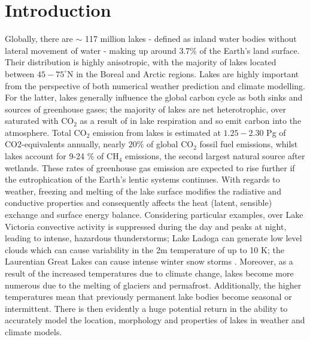 \documentclass[twocolumn]{article}
\begin{document}
\section{Introduction}  %
Globally, there are $\sim$ 117 million lakes - defined as inland water bodies without lateral movement of water - making up around 3.7$\%$ of the Earth's land surface\cite{Verpoorter2014}. Their distribution is highly anisotropic, with the majority of lakes located between $45-75^{\circ}$N in the Boreal and Arctic regions. Lakes are highly important from the perspective of both numerical weather prediction and climate modelling.  For the latter, lakes generally influence the global carbon cycle as both sinks and sources of greenhouse gases; the majority of lakes are net heterotrophic, over saturated with CO$_2$ as a result of in lake respiration and so emit carbon into the atmosphere\cite{Pace2005,Tranvik2009}.  Total CO$_2$ emission from lakes is estimated at $1.25 - 2.30$ Pg of CO2-equivalents annually\cite{DelSontro2018}, nearly $20 \%$ of global CO$_2$ fossil fuel emissions, whilst lakes account for 9-24 $\%$  of CH$_4$ emissions, the second largest natural source after wetlands\cite{Saunois2020}. These rates of greenhouse gas emission are expected to rise further if the eutrophication of the Earth's lentic systems continues. With regards to weather, freezing and melting of the lake surface modifies the radiative and conductive properties and consequently affects the heat (latent, sensible) exchange and surface energy balance\cite{Huang2019,Peng2020,Franz2018}. Considering particular examples, over Lake Victoria convective activity is suppressed during the day and peaks at night, leading to intense, hazardous thunderstorms\cite{Thiery2015,Thiery_2017}; Lake Ladoga can generate low level clouds which can cause variability in the 2m temperature of up to 10 K\cite{Eerola2014}; the Laurentian Great Lakes can cause intense winter snow storms\cite{Vavrus2013} \cite{Notaro2013}. Moreover, as a result of the increased temperatures due to climate change, lakes become more numerous due to the melting of glaciers and permafrost. Additionally, the higher temperatures mean that previously permanent lake bodies become seasonal or intermittent. There is then evidently a huge potential return in the ability to accurately model the location, morphology and properties of lakes in weather and climate models. \newline 
\end{document}
